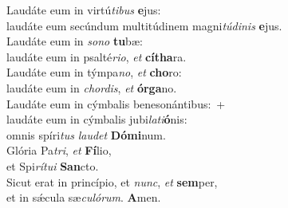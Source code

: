 \evenverse Laudáte eum in virtú\textit{ti}\textit{bus} \textbf{e}jus:~\*\\
\evenverse laudáte eum secúndum multitúdinem magni\textit{tú}\textit{di}\textit{nis} \textbf{e}jus.\\
\oddverse Laudáte eum in \textit{so}\textit{no} \textbf{tu}bæ:~\*\\
\oddverse laudáte eum in psalté\textit{ri}\textit{o}, \textit{et} \textbf{cí}\textbf{tha}ra.\\
\evenverse Laudáte eum in týmpa\textit{no}, \textit{et} \textbf{cho}ro:~\*\\
\evenverse laudáte eum in \textit{chor}\textit{dis}, \textit{et} \textbf{ór}\textbf{ga}no.\\
\oddverse Laudáte eum in cýmbalis benesonántibus:~+\\
\oddverse  laudáte eum in cýmbalis jubi\textit{la}\textit{ti}\textbf{ó}nis:~\*\\
\oddverse omnis spíri\textit{tus} \textit{lau}\textit{det} \textbf{Dó}\textbf{mi}num.\\
\evenverse Glória Pa\textit{tri}, \textit{et} \textbf{Fí}lio,~\*\\
\evenverse et Spi\textit{rí}\textit{tu}\textit{i} \textbf{San}cto.\\
\oddverse Sicut erat in princípio, et \textit{nunc}, \textit{et} \textbf{sem}per,~\*\\
\oddverse et in sǽcula sæ\textit{cu}\textit{ló}\textit{rum}. \textbf{A}men.\\

